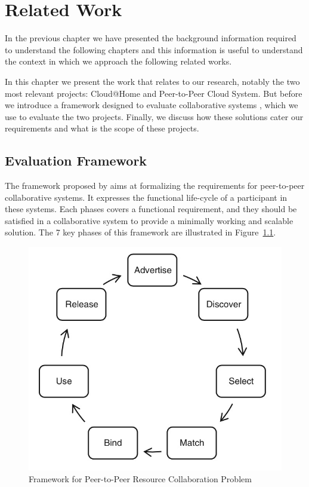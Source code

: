 \documentclass[12pt, titlepage]{uo_temp}
\begin{document}
     \chapter{Related Work}\label{rel_work}
     In the previous chapter we have presented the background information required to
     understand the following chapters and this information is useful to understand the
     context in which we approach the following related works.

     In this chapter we present the work that relates to our research, notably the two
     most relevant projects: Cloud@Home and Peer-to-Peer Cloud System. But before we
     introduce a framework designed to evaluate collaborative systems \cite{p2p_collab},
     which we use to evaluate the two projects. Finally, we discuss how these
     solutions cater our requirements and what is the scope of these projects.

     \section{Evaluation Framework}\label{rel_EvalFramework}
     The framework proposed by \cite{p2p_collab} aims at formalizing the requirements for
     peer-to-peer collaborative systems. It expresses the functional life-cycle of a
     participant in these systems. Each phases covers a functional requirement, and they
     should be satisfied in a collaborative system to provide a minimally working and
     scalable solution. The 7 key phases of this framework are illustrated in
     Figure~\ref{p2p_collab_fig}.
       \begin{figure}[h]
         \centering
         \includegraphics[width=125mm]{images/p2p_collab.jpg}
         \caption{Framework for Peer-to-Peer Resource Collaboration
           Problem \label{p2p_collab_fig} \cite{p2p_collab}}
       \end{figure}
\end{document}
